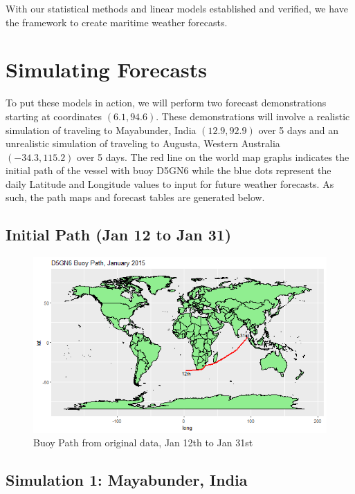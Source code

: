 \documentclass{article}
\begin{document}
With our statistical methods and linear models established and verified, we have the framework to create maritime weather forecasts.

\section{Simulating Forecasts}

To put these models in action, we will perform two forecast demonstrations starting at coordinates $(6.1, 94.6)$. These demonstrations will involve a realistic simulation of traveling to Mayabunder, India $(12.9, 92.9)$ over 5 days and an unrealistic simulation of traveling to Augusta, Western Australia \\ $(-34.3, 115.2)$ over 5 days. The red line on the world map graphs indicates the initial path of the vessel with buoy D5GN6 while the blue dots represent the daily Latitude and Longitude values to input for future weather forecasts. As such, the path maps and forecast tables are generated below.

\newpage

\subsection*{Initial Path (Jan 12 to Jan 31)}

\begin{figure}[h]
    \centering
    \includegraphics[scale = 0.45]{volume/Buoy_Path_D5GN6.png}
    \caption{Buoy Path from original data, Jan 12th to Jan 31st}
    \label{fig:initPath}
\end{figure}

\subsection{Simulation 1: Mayabunder, India}
\end{document}
